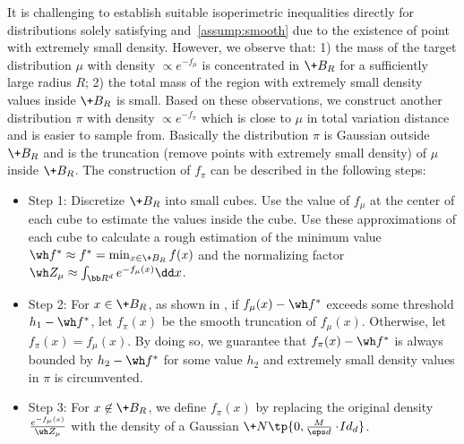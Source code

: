 \documentclass[11pt,a4paper]{article}
\begin{document}
It is challenging to establish suitable isoperimetric inequalities directly for distributions solely satisfying  and~\ref{assump:smooth} due to the existence of point with extremely small density. However, we observe that: 1) the mass of the target distribution $\mu$ with density $\propto e^{-f_{\mu}}$ is concentrated in $\+B_{R}$ for a sufficiently large radius $R$; 2) the total mass of the region with extremely small density values inside $\+B_{R}$ is small.
Based on these observations, we construct another distribution $\pi$  with density $\propto e^{-f_{\pi}}$ which is close to $\mu$ in total variation distance and is easier to sample from. Basically the distribution $\pi$ is Gaussian outside $\+B_R$ and is the truncation (remove points with extremely small density) of $\mu$ inside $\+B_R$. The construction of $f_{\pi}$ can be described in the following steps:
\begin{itemize}
    \item Step 1: Discretize $\+B_R$ into small cubes. Use the value of $f_{\mu}$ at the center of each cube to estimate the values inside the cube. Use these approximations of each cube to calculate a rough estimation of the minimum value $\wh f^* \approx f^*= \min_{x\in \+B_R} f(x)$ and the normalizing factor $\wh Z_{\mu}\approx \int_{\bb R^d} e^{-f_{\mu}(x)} \dd x$.
    \item Step 2: For $x\in \+B_R$, as shown in , if $f_{\mu}(x) - \wh f^*$ exceeds some threshold $h_1-\wh f^*$, let $f_{\pi}(x)$ be the smooth truncation of $f_{\mu}(x)$. Otherwise, let $f_{\pi}(x) = f_{\mu}(x)$. By doing so, we guarantee that $f_{\pi}(x) - \wh f^*$ is always bounded by $h_2-\wh f^*$ for some value $h_2$ and extremely small density values in $\pi$ is circumvented.
    \item Step 3: For $x\not \in \+B_R$, %
    we define $f_{\pi}(x)$ by replacing the original density $\frac{e^{-f_{\mu}(x)}}{\wh Z_{\mu}}$ with the density of a Gaussian $\+N\tp{0, \frac{M}{\eps d}\cdot \!{Id}_d}$.
\end{itemize}
\end{document}
